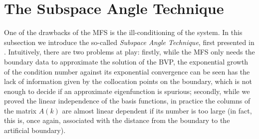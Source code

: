 \section{The Subspace Angle Technique} \label{sat_appendix}

One of the drawbacks of the \ac{MFS} is the ill-conditioning of the system. In this subsection we introduce the so-called \textit{Subspace Angle Technique}, first presented in \cite{betcke2005reviving}. Intuitively, there are two problems at play: firstly, while the \ac{MFS} only needs the boundary data to approximate the solution of the \ac{BVP}, the exponential growth of the condition number against its exponential convergence can be seen has the lack of information given by the collocation points on the boundary, which is not enough to decide if an approximate eigenfunction is spurious; secondly, while we proved the linear independence of the basis functions, in practice the columns of the matrix \(A(k)\) are almost linear dependent if its number is too large (in fact, this is, once again, associated with the distance from the boundary to the artificial boundary).


